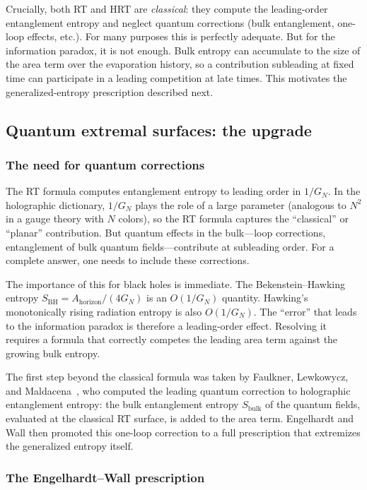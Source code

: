\documentclass[11pt,letterpaper]{article}
\theoremstyle{plain}
\theoremstyle{definition}
\theoremstyle{remark}
\begin{document}
Crucially, both RT and HRT are \emph{classical}: they compute the
leading-order entanglement entropy and neglect quantum corrections
(bulk entanglement, one-loop effects, etc.).  For many purposes this
is perfectly adequate.  But for the information paradox, it is not
enough. Bulk entropy can accumulate to the size of the area term over
the evaporation history, so a contribution subleading at fixed time can
participate in a leading competition at late times. This motivates the
generalized-entropy prescription described next.


\subsection{Quantum extremal surfaces: the upgrade}
\label{subsec04:qes}

\subsubsection*{The need for quantum corrections}

The RT formula computes entanglement entropy to leading order in
$1/G_N$.  In the holographic dictionary, $1/G_N$ plays the role of a
large parameter (analogous to $N^2$ in a gauge theory with $N$
colors), so the RT formula captures the ``classical'' or ``planar''
contribution.  But quantum effects in the bulk---loop corrections,
entanglement of bulk quantum fields---contribute at subleading order.
For a complete answer, one needs to include these corrections.

The importance of this for black holes is immediate.  The
Bekenstein--Hawking entropy $S_{\mathrm{BH}} =
A_{\mathrm{horizon}}/(4G_N)$ is an $O(1/G_N)$ quantity.  Hawking's
monotonically rising radiation entropy is also $O(1/G_N)$.  The
``error'' that leads to the information paradox is therefore a
leading-order effect.  Resolving it requires a formula that correctly
competes the leading area term against the growing bulk entropy.

The first step beyond the classical formula was taken by Faulkner,
Lewkowycz, and Maldacena~\citeyearpar{faulkneretal2013}, who computed
the leading quantum correction to holographic entanglement entropy:
the bulk entanglement entropy $S_{\mathrm{bulk}}$ of the quantum
fields, evaluated at the classical RT surface, is added to the area
term.  Engelhardt and Wall then promoted this one-loop correction to
a full prescription that extremizes the generalized entropy itself.

\subsubsection*{The Engelhardt--Wall prescription}
\end{document}
